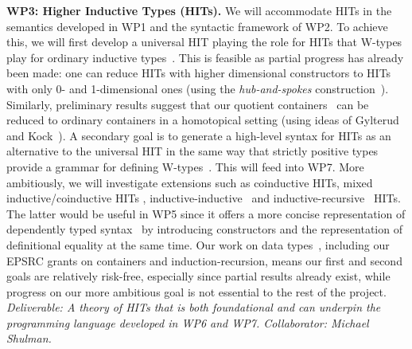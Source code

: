 \documentclass[a4paper,11pt]{article}
\begin{document}

{\bf WP3: Higher Inductive Types (HITs).}  We will accommodate HITs in
the semantics developed in WP1 and the syntactic framework of WP2. To
achieve this, we will first develop a universal HIT playing the role for
HITs that W-types play for ordinary inductive
types~\cite{alti:cont-tcs}. This is feasible as partial progress has
already been made: one can reduce HITs with higher dimensional
constructors to HITs with only 0- and 1-dimensional ones (using the
\emph{hub-and-spokes} construction~\cite{hott-book}).
Similarly, preliminary results suggest that our quotient
containers~\cite{alti:mpc04} can be reduced
to ordinary containers in a homotopical setting 
(using ideas of Gylterud~\cite{gylterud:thesis} and
Kock~\cite{kock:groupoids}).
%
A secondary goal is to generate a high-level syntax for HITs as
an alternative to the universal HIT in the same way that strictly
positive types provide a grammar for defining 
W-types~\cite{alti:cont-tcs}.  This will feed into WP7.
More ambitiously, we will %
investigate extensions such as coinductive HITs, mixed
inductive/coinductive HITs \cite{txa:mpc2010g}, 
inductive-inductive~\cite{alti:catind2} and
inductive-recursive~\cite{DS:indrec,ghani:fibredIR} HITs. The latter would be useful
in WP5 since it offers a more concise representation of dependently
typed syntax~\cite{chapman2009type} by introducing
constructors and the representation of definitional equality at the
same time.
Our work on data
types~\cite{alti:cont-tcs,
altenkirchGhaniHancockMcBrideMorris:indexedContainers,
alti:catind2,ghani:fibredIR,GambinoN:polfpm,awodeyGamSoja:indTypesInHTT},
including our EPSRC grants on containers and induction-recursion, means
our first and second goals
are relatively risk-free,
especially since partial results already exist, 
while progress on our more ambitious goal 
is not essential to the rest of the project. {\em Deliverable: A
  theory of HITs that is both foundational and can underpin the
  programming language developed in WP6 and WP7. 
Collaborator: Michael Shulman. 
}
\end{document}
